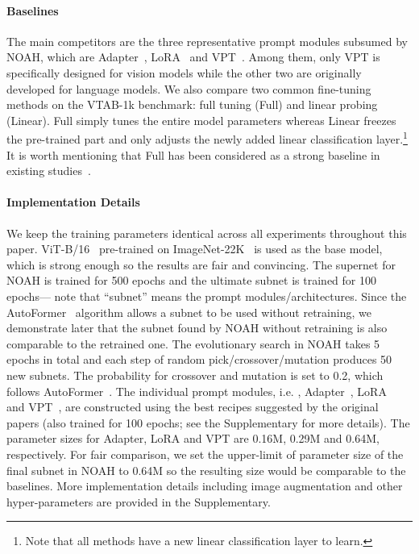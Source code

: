 \paragraph{Baselines}
The main competitors are the three representative prompt modules subsumed by NOAH, which are Adapter~\cite{houlsby2019parameter}, LoRA~\cite{hu2021lora} and VPT~\cite{jia2022visual}. Among them, only VPT is specifically designed for vision models while the other two are originally developed for language models. We also compare two common fine-tuning methods on the VTAB-1k benchmark: full tuning (Full) and linear probing (Linear). Full simply tunes the entire model parameters whereas Linear freezes the pre-trained part and only adjusts the newly added linear classification layer.\footnote{Note that all methods have a new linear classification layer to learn.} It is worth mentioning that Full has been considered as a strong baseline in existing studies~\cite{jia2022visual,houlsby2019parameter}.

\paragraph{Implementation Details} We keep the training parameters identical across all experiments throughout this paper. ViT-B/16~\cite{dosovitskiy2020image} pre-trained on ImageNet-22K~\cite{deng2009imagenet} is used as the base model, which is strong enough so the results are fair and convincing. The supernet for NOAH is trained for 500 epochs and the ultimate subnet is trained for 100 epochs--- note that ``subnet'' means the prompt modules/architectures. Since the AutoFormer~\cite{chen2021autoformer} algorithm allows a subnet to be used without retraining, we demonstrate later that the subnet found by NOAH without retraining is also comparable to the retrained one. The evolutionary search in NOAH takes 5 epochs in total and each step of random pick/crossover/mutation produces 50 new subnets. The probability for crossover and mutation is set to 0.2, which follows AutoFormer~\cite{chen2021autoformer}. The individual prompt modules, i.e. , Adapter~\cite{houlsby2019parameter}, LoRA~\cite{hu2021lora} and VPT~\cite{jia2022visual}, are constructed using the best recipes suggested by the original papers (also trained for 100 epochs; see the Supplementary for more details). The parameter sizes for Adapter, LoRA and VPT are 0.16M, 0.29M and 0.64M, respectively. For fair comparison, we set the upper-limit of parameter size of the final subnet in NOAH to 0.64M so the resulting size would be comparable to the baselines. More implementation details including image augmentation and other hyper-parameters are provided in the Supplementary.

